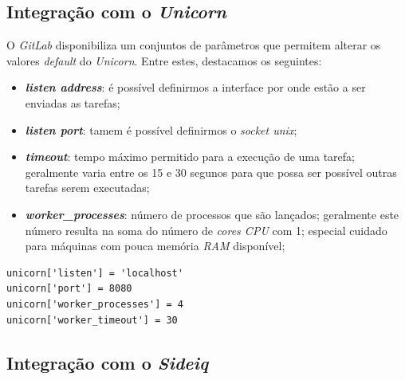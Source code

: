 \documentclass[12pt,a4paper]{article}
\begin{document}
\subsection{Integração com o \emph{Unicorn}}

O \emph{GitLab} disponibiliza um conjuntos de parâmetros que permitem alterar os valores \emph{default} do \emph{Unicorn}. Entre estes, destacamos os seguintes:

\begin{itemize}
    \item \textbf{\emph{listen address}}: é possível definirmos a interface por onde estão a ser enviadas as tarefas;
    \item \textbf{\emph{listen port}}: tamem é possível definirmos o \emph{socket unix};
    \item \textbf{\emph{timeout}}: tempo máximo permitido para a execução de uma tarefa; geralmente varia entre os 15 e 30 segunos para que possa ser possível outras tarefas serem executadas;
    \item \textbf{\emph{worker\_processes}}: número de processos que são lançados; geralmente este número resulta na soma do número de \emph{cores CPU} com 1; especial cuidado para máquinas com pouca memória \emph{RAM} disponível;
\end{itemize}



\begin{verbatim}
unicorn['listen'] = 'localhost'
unicorn['port'] = 8080
unicorn['worker_processes'] = 4
unicorn['worker_timeout'] = 30
\end{verbatim}


\subsection{Integração com o \emph{Sideiq}}
\end{document}
